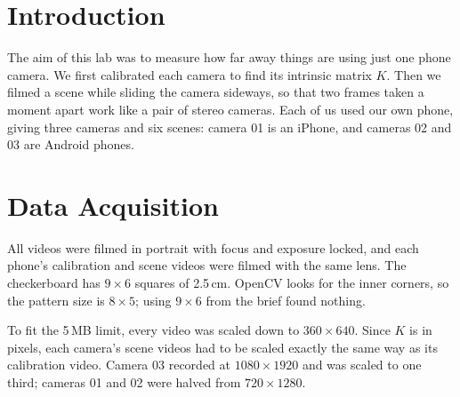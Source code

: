 \section{Introduction}
The aim of this lab was to measure how far away things are using just one phone camera. We first
calibrated each camera to find its intrinsic matrix $K$. Then we filmed a scene while sliding the
camera sideways, so that two frames taken a moment apart work like a pair of stereo cameras. Each
of us used our own phone, giving three cameras and six scenes: camera 01 is an iPhone, and cameras
02 and 03 are Android phones.

\section{Data Acquisition}
All videos were filmed in portrait with focus and exposure locked, and each phone's calibration
and scene videos were filmed with the same lens. The checkerboard has $9\times6$ squares of
2.5\,cm. OpenCV looks for the inner corners, so the pattern size is $8\times5$; using $9\times6$
from the brief found nothing.

To fit the 5\,MB limit, every video was scaled down to $360\times640$. Since $K$ is in pixels, each
camera's scene videos had to be scaled exactly the same way as its calibration video. Camera 03
recorded at $1080\times1920$ and was scaled to one third; cameras 01 and 02 were
halved from $720\times1280$.
